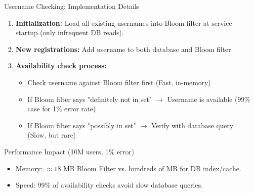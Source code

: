 \begin{frame}{Username Checking: Implementation Details}
  \begin{enumerate}
    \item \textbf{Initialization:} Load all existing usernames into Bloom filter at service startup (only infrequent DB reads).
    \item \textbf{New registrations:} Add username to both database and Bloom filter.
    \item \textbf{Availability check process:}
          \begin{itemize}
            \item Check username against Bloom filter first (Fast, in-memory)
            \item If Bloom filter says "definitely not in set" $\rightarrow$ Username is available (99\% case for 1\% error rate)
            \item If Bloom filter says "possibly in set" $\rightarrow$ Verify with database query (Slow, but rare)
          \end{itemize}
  \end{enumerate}

  \begin{block}{Performance Impact (10M users, 1\% error)}
    \begin{itemize}
      \item Memory: $\approx 18$ MB Bloom Filter vs. hundreds of MB for DB index/cache.
      \item Speed: 99\% of availability checks avoid slow database queries.
    \end{itemize}
  \end{block}
\end{frame}


